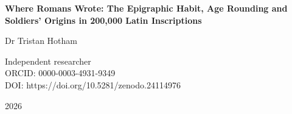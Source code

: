 \documentclass[11pt,a4paper]{article}
\begin{document}
\begin{center}
{\Large\bfseries Where Romans Wrote: The Epigraphic Habit, Age Rounding and Soldiers' Origins in 200,000 Latin Inscriptions\par}
\vspace{1.2em}
{\large Dr Tristan Hotham\par}
\vspace{0.3em}
{\small Independent researcher\\
ORCID: 0000-0003-4931-9349\\
DOI: https://doi.org/10.5281/zenodo.24114976\par}
\vspace{0.8em}
2026
\end{center}

\end{document}
